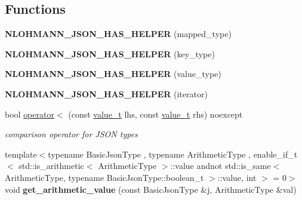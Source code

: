 \subsection*{Functions}
\begin{DoxyCompactItemize}
\item 
{\bfseries N\+L\+O\+H\+M\+A\+N\+N\+\_\+\+J\+S\+O\+N\+\_\+\+H\+A\+S\+\_\+\+H\+E\+L\+P\+ER} (mapped\+\_\+type)\hypertarget{namespacenlohmann_1_1detail_a7b2601c238073c43a07862768b319cf8}{}\label{namespacenlohmann_1_1detail_a7b2601c238073c43a07862768b319cf8}

\item 
{\bfseries N\+L\+O\+H\+M\+A\+N\+N\+\_\+\+J\+S\+O\+N\+\_\+\+H\+A\+S\+\_\+\+H\+E\+L\+P\+ER} (key\+\_\+type)\hypertarget{namespacenlohmann_1_1detail_ad19328f0c4ffe2890ecafb7c89e0355b}{}\label{namespacenlohmann_1_1detail_ad19328f0c4ffe2890ecafb7c89e0355b}

\item 
{\bfseries N\+L\+O\+H\+M\+A\+N\+N\+\_\+\+J\+S\+O\+N\+\_\+\+H\+A\+S\+\_\+\+H\+E\+L\+P\+ER} (value\+\_\+type)\hypertarget{namespacenlohmann_1_1detail_af3e900eb1e0b107c812f7babbb94e69e}{}\label{namespacenlohmann_1_1detail_af3e900eb1e0b107c812f7babbb94e69e}

\item 
{\bfseries N\+L\+O\+H\+M\+A\+N\+N\+\_\+\+J\+S\+O\+N\+\_\+\+H\+A\+S\+\_\+\+H\+E\+L\+P\+ER} (iterator)\hypertarget{namespacenlohmann_1_1detail_a6648328c4b1466fdc48f1fcfbff23e2f}{}\label{namespacenlohmann_1_1detail_a6648328c4b1466fdc48f1fcfbff23e2f}

\item 
bool \hyperlink{namespacenlohmann_1_1detail_a09169efff3bd1771fff29bd92cea19e0}{operator$<$} (const \hyperlink{namespacenlohmann_1_1detail_a1ed8fc6239da25abcaf681d30ace4985}{value\+\_\+t} lhs, const \hyperlink{namespacenlohmann_1_1detail_a1ed8fc6239da25abcaf681d30ace4985}{value\+\_\+t} rhs) noexcept
\begin{DoxyCompactList}\small\item\em comparison operator for J\+S\+ON types \end{DoxyCompactList}\item 
{\footnotesize template$<$typename Basic\+Json\+Type , typename Arithmetic\+Type , enable\+\_\+if\+\_\+t$<$ std\+::is\+\_\+arithmetic$<$ Arithmetic\+Type $>$\+::value andnot std\+::is\+\_\+same$<$ Arithmetic\+Type, typename Basic\+Json\+Type\+::boolean\+\_\+t $>$\+::value, int $>$  = 0$>$ }\\void {\bfseries get\+\_\+arithmetic\+\_\+value} (const Basic\+Json\+Type \&j, Arithmetic\+Type \&val)\hypertarget{namespacenlohmann_1_1detail_a85955b9c6dd31846e4b8e891f78614b6}{}\label{namespacenlohmann_1_1detail_a85955b9c6dd31846e4b8e891f78614b6}


\end{DoxyCompactItemize}
